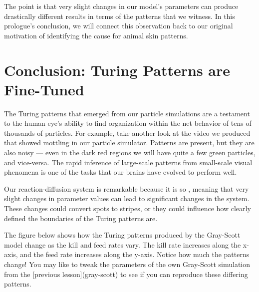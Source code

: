 {{{{{{{{{{{The point is that very slight changes in our model's parameters can produce drastically different results in terms of the patterns that we witness. In this prologue's conclusion, we will connect this observation back to our original motivation of identifying the cause for animal skin patterns.



















\FloatBarrier
{}

\section{Conclusion: Turing Patterns are Fine-Tuned}
\label{sec:conclusion:_turing_patterns_are_fine-tuned}


The Turing patterns that emerged from our particle simulations are a testament to the human eye's ability to find organization within the net behavior of tens of thousands of particles. For example, take another look at the video we produced that showed mottling in our particle simulator. Patterns are present, but they are also noisy --- even in the dark red regions we will have quite a few green particles, and vice-versa. The rapid inference of large-scale patterns from small-scale visual phenomena is one of the tasks that our brains have evolved to perform well.

{%

Our reaction-diffusion system is remarkable because it is so , meaning that very slight changes in parameter values can lead to significant changes in the system. These changes could convert spots to stripes, or they could influence how clearly defined the boundaries of the Turing patterns are.

The figure below shows how the Turing patterns produced by the Gray-Scott model change as the kill and feed rates vary. The kill rate increases along the x-axis, and the feed rate increases along the y-axis. Notice how much the patterns change! You may like to tweak the parameters of the own Gray-Scott simulation from the [previous lesson](gray-scott) to see if you can reproduce these differing patterns.

}}}}}}}}}}}}
